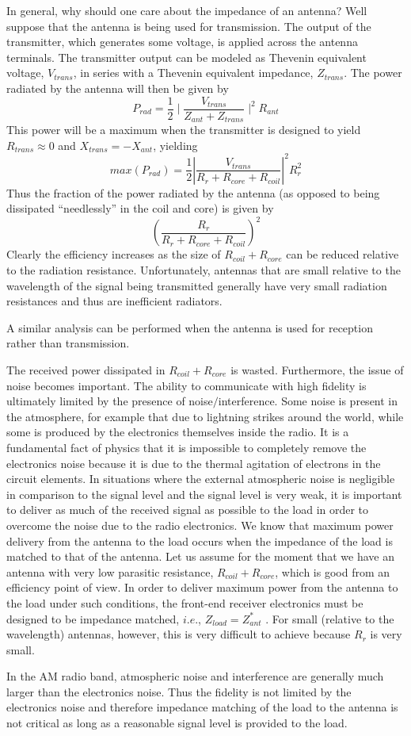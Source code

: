 \documentclass [utf8] {article}
\begin{document}
{	In general, why should one care about the impedance of an antenna? Well suppose that the antenna is being used for transmission. The output of the transmitter, which generates some voltage, is applied across the antenna terminals. The transmitter output can be modeled as Thevenin equivalent voltage, $V_{trans}$, in series with a Thevenin equivalent impedance, $Z_{trans}$. The power radiated by the antenna will then be given by
	$$ P_{rad} = \frac{1}{2}\mid\frac{V_{trans}}{Z_{ant}+Z_{trans}}\mid^2 R_{ant} $$
	This power will be a maximum when the transmitter is designed to yield $R_{trans} \approx 0$ and $X_{trans} = - X_{ant}$, yielding
	$$ max(P_{rad}) = \frac{1}{2}|\frac{V_{trans}}{R_r+R_{core}+R_{coil}}|^2R_r^2$$
	Thus the fraction of the power radiated by the antenna (as opposed to being dissipated “needlessly” in the coil and core) is given by
	$$(\frac{R_r}{R_r+R_{core}+R_{coil}})^2$$
	Clearly the efficiency increases as the size of $R_{coil} + R_{core}$ can be reduced relative to the radiation resistance. Unfortunately, antennas that are small relative to the wavelength of the signal being transmitted generally have very small radiation resistances and thus are inefficient radiators.

	A similar analysis can be performed when the antenna is used for reception rather than transmission.

	The received power dissipated in $R_{coil} + R_{core}$ is wasted. Furthermore, the issue of noise becomes important. The ability to communicate with high fidelity is ultimately limited by the presence of noise$/$interference. Some noise is present in the atmosphere, for example that due to lightning strikes around the world, while some is produced by the electronics themselves inside the radio. It is a fundamental fact of physics that it is impossible to completely remove the electronics noise because it is due to the thermal agitation of electrons in the circuit elements. In situations where the external atmospheric noise is negligible in comparison to the signal level and the signal level is very weak, it is important to deliver as much of the received signal as possible to the load in order to overcome the noise due to the radio electronics. We know that maximum power delivery from the antenna to the load occurs when the impedance of the load is matched to that of the antenna. Let us assume for the moment that we have an antenna with very low parasitic resistance, $R_{coil} + R_{core}$, which is good from an efficiency point of view. In order to deliver maximum power from the antenna to the load under such conditions, the front-end receiver electronics must be designed to be impedance matched, $i.e.$, $Z_{load} = Z_{ant}^{*}$ . For small (relative to the wavelength) antennas, however, this is very difficult to achieve because $R_r$ is very small.

	In the AM radio band, atmospheric noise and interference are generally much larger than the electronics noise. Thus the fidelity is not limited by the electronics noise and therefore impedance matching of the load to the antenna is not critical as long as a reasonable signal level is provided to the load.
}
\end{document}
